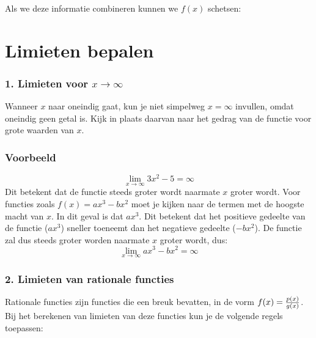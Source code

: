 \documentclass[
  a4paper,
]{scrbook}
\theoremstyle{definition}
\theoremstyle{remark}
\begin{document}
Als we deze informatie combineren kunnen we \(f(x)\) schetsen:

\section{Limieten bepalen}\label{limieten-bepalen}

\subsubsection*{\texorpdfstring{1. Limieten voor
\(x\to \infty\)}{1. Limieten voor x\textbackslash to \textbackslash infty}}\label{limieten-voor-xto-infty}

Wanneer \(x\) naar oneindig gaat, kun je niet simpelweg \(x= \infty\)
invullen, omdat oneindig geen getal is. Kijk in plaats daarvan naar het
gedrag van de functie voor grote waarden van \(x\).

\subsubsection*{Voorbeeld}\label{voorbeeld-2}

\[ \lim_{x \to \infty} 3 x^2 -5 = \infty\] Dit betekent dat de functie
steeds groter wordt naarmate \(x\) groter wordt. \textbar{} Voor
functies zoals \(f(x)=ax^3-bx^2\) moet je kijken naar de termen met de
hoogste macht van \(x\). In dit geval is dat \(ax^3\). Dit betekent dat
het positieve gedeelte van de functie (\(ax^3\)) sneller toeneemt dan
het negatieve gedeelte (\(-bx^2\)). De functie zal dus steeds groter
worden naarmate \(x\) groter wordt, dus:
\[ \lim_{x \to \infty} ax^3 - bx^2= \infty\]

\subsubsection*{2. Limieten van rationale
functies}\label{limieten-van-rationale-functies}

Rationale functies zijn functies die een breuk bevatten, in de vorm
\(f(x)={p(x) \over g(x)}\). Bij het berekenen van limieten van deze
functies kun je de volgende regels toepassen:
\end{document}
